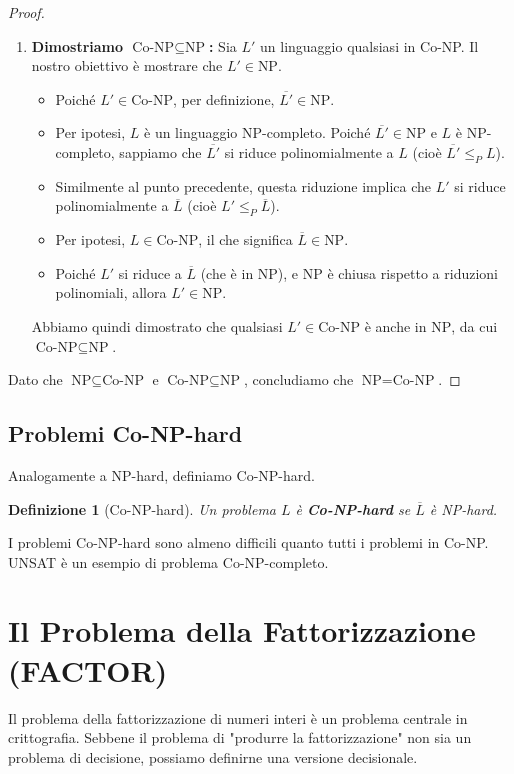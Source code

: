 \documentclass[a4paper, 11pt]{book} %
\newtheorem{definition}[theorem]{Definizione}
\theoremstyle{definition}
\begin{document}
\begin{proof}
\begin{enumerate}
    \item \textbf{Dimostriamo $\text{Co-NP} \subseteq \text{NP}$:}
    Sia $L'$ un linguaggio qualsiasi in Co-NP. Il nostro obiettivo è mostrare che $L' \in \text{NP}$.
    \begin{itemize}
        \item Poiché $L' \in \text{Co-NP}$, per definizione, $\overline{L'} \in \text{NP}$.
        \item Per ipotesi, $L$ è un linguaggio NP-completo. Poiché $\overline{L'} \in \text{NP}$ e $L$ è NP-completo, sappiamo che $\overline{L'}$ si riduce polinomialmente a $L$ (cioè $\overline{L'} \le_P L$).
        \item Similmente al punto precedente, questa riduzione implica che $L'$ si riduce polinomialmente a $\overline{L}$ (cioè $L' \le_P \overline{L}$).
        \item Per ipotesi, $L \in \text{Co-NP}$, il che significa $\overline{L} \in \text{NP}$.
        \item Poiché $L'$ si riduce a $\overline{L}$ (che è in NP), e NP è chiusa rispetto a riduzioni polinomiali, allora $L' \in \text{NP}$.
    \end{itemize}
    Abbiamo quindi dimostrato che qualsiasi $L' \in \text{Co-NP}$ è anche in $\text{NP}$, da cui $\text{Co-NP} \subseteq \text{NP}$.
\end{enumerate}
Dato che $\text{NP} \subseteq \text{Co-NP}$ e $\text{Co-NP} \subseteq \text{NP}$, concludiamo che $\text{NP} = \text{Co-NP}$.
\end{proof}

\subsection{Problemi Co-NP-hard}
Analogamente a NP-hard, definiamo Co-NP-hard.
\begin{definition}[Co-NP-hard]
Un problema $L$ è \textbf{Co-NP-hard} se $\overline{L}$ è NP-hard.
\end{definition}
I problemi Co-NP-hard sono almeno difficili quanto tutti i problemi in Co-NP. UNSAT è un esempio di problema Co-NP-completo.

\section{Il Problema della Fattorizzazione (FACTOR)}

Il problema della fattorizzazione di numeri interi è un problema centrale in crittografia. Sebbene il problema di "produrre la fattorizzazione" non sia un problema di decisione, possiamo definirne una versione decisionale.
\end{document}

